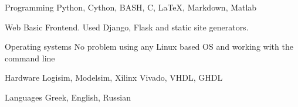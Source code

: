 


\begin{cvskills}


\cvskill
{Programming} %
{Python, Cython, BASH, C, LaTeX, Markdown, Matlab} %


\cvskill
{Web} %
{Basic Frontend. Used Django, Flask and static site generators.} %


\cvskill
{Operating systems} %
{No problem using any Linux based OS and working with the command line} %


\cvskill
{Hardware} %
{Logisim, Modelsim, Xilinx Vivado, VHDL, GHDL} %


\cvskill
{Languages} %
{Greek, English, Russian} %

\end{cvskills}